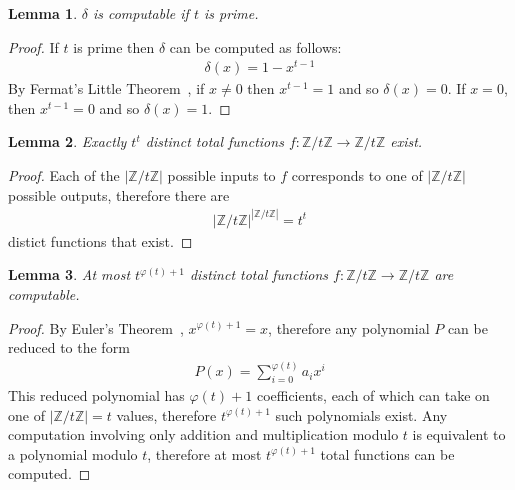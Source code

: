 \documentclass{article}
\def\zt{\mathbb{Z}/t\mathbb{Z}}
\newtheorem{lem}{Lemma}
\begin{document}
    \begin{lem}
      \label{lem2}
        $\delta$ is computable if $t$ is prime.
    \end{lem}
    \begin{proof}
        If $t$ is prime then $\delta$ can be computed as follows:
        \begin{align}
            \delta(x) = 1 - x^{t - 1}
        \end{align}
        By Fermat's Little Theorem~\cite{numbers}, if $x \neq 0$ then $x^{t - 1} = 1$ and so $\delta(x) = 0$.
        If $x = 0$, then $x^{t - 1} = 0$ and so $\delta(x) = 1$. 
    \end{proof}

    \begin{lem}
      \label{lem3}
        Exactly $t^{t}$ distinct total functions $f:\zt\to\zt$ exist. 
    \end{lem}
    \begin{proof}
        Each of the $|\zt|$ possible inputs to $f$ corresponds to 
        one of $|\zt|$ possible outputs, therefore there are
        \begin{align}
            |\zt|^{|\zt|} = t^t
        \end{align}
        distict functions that exist. 
    \end{proof}

    \begin{lem}
      \label{lem4}
        At most $t^{\varphi(t) + 1}$ distinct total functions $f:\zt\to\zt$ are computable.
    \end{lem}
    \begin{proof}
      By Euler's Theorem~\cite{numbers}, $x^{\varphi(t) + 1} = x$, 
        therefore any polynomial $P$ can be reduced to the form
        \begin{align}
          P(x) = \sum_{i = 0}^{\varphi(t)} a_{i}x^{i}
        \end{align}
        This reduced polynomial has $\varphi(t) + 1$ coefficients, 
        each of which can take on one of $|\zt| = t$ values,
        therefore $t^{\varphi(t) + 1}$ such polynomials exist. 
        Any computation involving only addition and multiplication modulo $t$
        is equivalent to a polynomial modulo $t$, therefore at most
        $t^{\varphi(t) + 1}$ total functions can be computed. 
    \end{proof}
\end{document}
